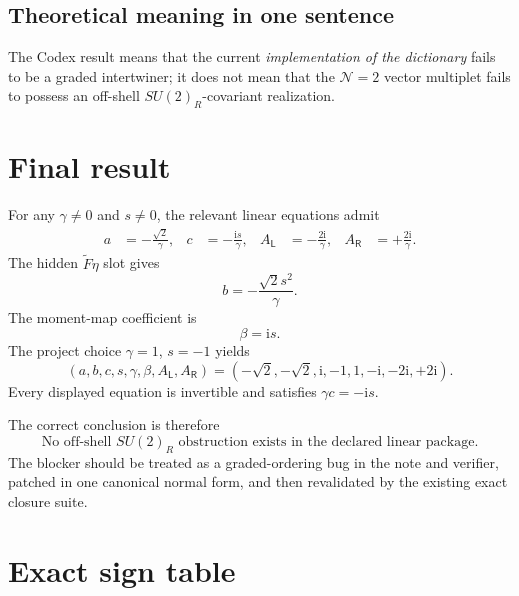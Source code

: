 \documentclass[11pt,a4paper,UTF8]{ctexart}
\numberwithin{equation}{section}
\newcommand{\ii}{\mathrm i}
\newcommand{\N}{\mathcal N}
\newcommand{\PL}{\mathsf L}
\newcommand{\PR}{\mathsf R}
\begin{document}
\subsection{Theoretical meaning in one sentence}

The Codex result means that the current \emph{implementation of the dictionary} fails to be a graded intertwiner; it does not mean that the $\N=2$ vector multiplet fails to possess an off-shell $SU(2)_R$-covariant realization.

\section{Final result}

\begin{resultbox}
For any $\gamma\neq0$ and $s\neq0$, the relevant linear equations admit
\begin{align}
 a&=-\frac{\sqrt2}{\gamma},
& c&=-\frac{\ii s}{\gamma},
& A_{\PL}&=-\frac{2\ii}{\gamma},
& A_{\PR}&=+\frac{2\ii}{\gamma}.
\end{align}
The hidden $\widetilde F\eta$ slot gives
\[
b=-\frac{\sqrt2s^2}{\gamma}.
\]
The moment-map coefficient is
\[
\beta=\ii s.
\]
The project choice $\gamma=1$, $s=-1$ yields
\[
(a,b,c,s,\gamma,\beta,A_{\PL},A_{\PR})
=(-\sqrt2,-\sqrt2,\ii,-1,1,-\ii,-2\ii,+2\ii).
\]
Every displayed equation is invertible and satisfies $\gamma c=-\ii s$.
\end{resultbox}

The correct conclusion is therefore
\begin{equation}
\boxed{
\text{No off-shell }SU(2)_R\text{ obstruction exists in the declared linear package.}}
\end{equation}
The blocker should be treated as a graded-ordering bug in the note and verifier, patched in one canonical normal form, and then revalidated by the existing exact closure suite.

\appendix

\section{Exact sign table}
\end{document}
